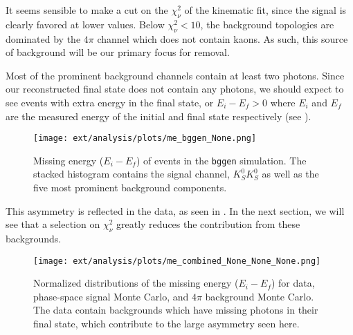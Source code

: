 It seems sensible to make a cut on the $\chi^2_\nu$ of the kinematic fit, since the signal is clearly favored at lower values. Below $\chi^2_\nu < 10$, the background topologies are dominated by the $4\pi$ channel which does not contain kaons. As such, this source of background will be our primary focus for removal.

Most of the prominent background channels contain at least two photons. Since our reconstructed final state does not contain any photons, we should expect to see events with extra energy in the final state, or $E_i - E_f > 0$ where $E_i$ and $E_f$ are the measured energy of the initial and final state respectively (see ).

\begin{figure}
  \begin{center}
    \texttt{[image: ext/analysis/plots/me\_bggen\_None.png]}
  \end{center}
  \caption{Missing energy ($E_i - E_f$) of events in the \texttt{bggen} simulation. The stacked histogram contains the signal channel, $K_S^0K_S^0$ as well as the five most prominent background components.}\label{fig:me-bggen}
\end{figure}

This asymmetry is reflected in the data, as seen in . In the next section, we will see that a selection on $\chi^2_\nu$ greatly reduces the contribution from these backgrounds.

\begin{figure}
  \begin{center}
    \texttt{[image: ext/analysis/plots/me\_combined\_None\_None\_None.png]}
  \end{center}
  \caption{Normalized distributions of the missing energy ($E_i - E_f$) for data, phase-space signal Monte Carlo, and $4\pi$ background Monte Carlo. The data contain backgrounds which have missing photons in their final state, which contribute to the large asymmetry seen here.}\label{fig:me-combined}
\end{figure}

